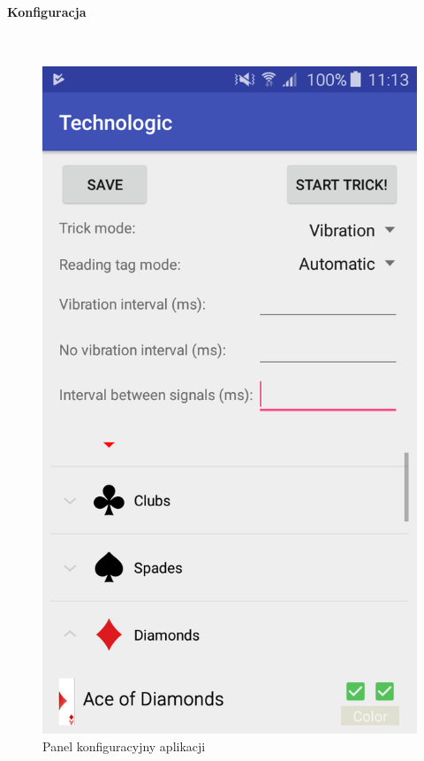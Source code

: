 \paragraph{Konfiguracja}\mbox{}\\
\begin{figure}[H]
\centering
\includegraphics[scale=0.22]{imgs/mainActivity.png}
\caption{Panel konfiguracyjny aplikacji}
\end{figure}
